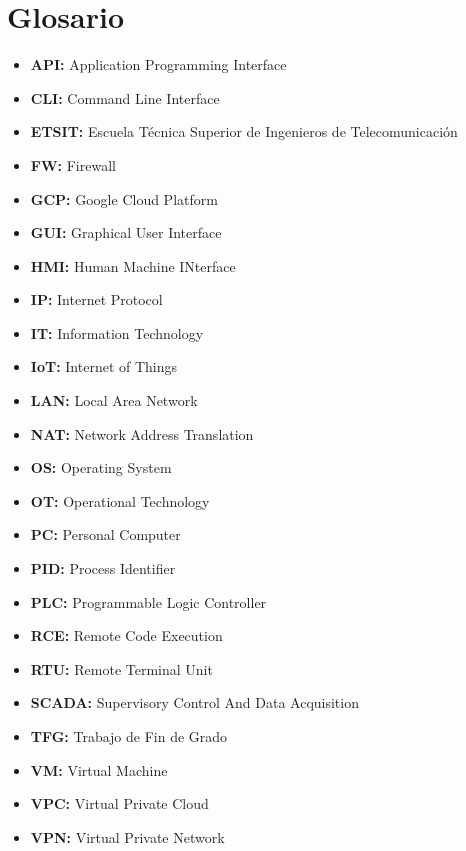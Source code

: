 \newpage
\thispagestyle{plain}
\section*{Glosario}

\begin{itemize} 
  \item \textbf{API:} Application Programming Interface
  \item \textbf{CLI:} Command Line Interface
  \item \textbf{ETSIT:} Escuela Técnica Superior de Ingenieros de Telecomunicación
  \item \textbf{FW:} Firewall
  \item \textbf{GCP:} Google Cloud Platform
  \item \textbf{GUI:} Graphical User Interface
  \item \textbf{HMI:} Human Machine INterface
  \item \textbf{IP:} Internet Protocol
  \item \textbf{IT:} Information Technology
  \item \textbf{IoT:} Internet of Things
  \item \textbf{LAN:} Local Area Network
  \item \textbf{NAT:} Network Address Translation
  \item \textbf{OS:} Operating System   
  \item \textbf{OT:} Operational Technology
  \item \textbf{PC:} Personal Computer
  \item \textbf{PID:} Process Identifier
  \item \textbf{PLC:} Programmable Logic Controller
  \item \textbf{RCE:} Remote Code Execution
  \item \textbf{RTU:} Remote Terminal Unit
  \item \textbf{SCADA:} Supervisory Control And Data Acquisition
  \item \textbf{TFG:} Trabajo de Fin de Grado
  \item \textbf{VM:} Virtual Machine
  \item \textbf{VPC:} Virtual Private Cloud
  \item \textbf{VPN:} Virtual Private Network 
\end{itemize}

\afterpage{\blankpage}

